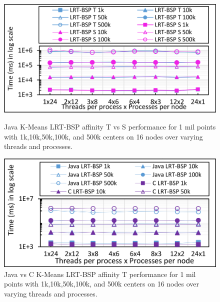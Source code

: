 \documentclass[10pt, conference, compsocconf]{IEEEtran}
\begin{document}
\begin{figure}[!htb]
    \begin{minipage}{0.49\textwidth}
        \centering
        \includegraphics[width=1\columnwidth]{images/fig_kmeans_1mil_varying_centers_BSP_T_vs_BSP_S_Java}
		\caption{Java K-Means \ac{LRT-BSP} affinity T vs S performance for 1 mil points with 1k,10k,50k,100k, and 500k centers on 16 nodes over varying threads and processes.}
		\label{fig:images/fig_kmeans_1mil_varying_centers_BSP_T_C_vs_Java}
    \end{minipage}
    \hspace{1.4mm}
    \begin{minipage}{0.49\textwidth}
        \centering
        \includegraphics[width=1\columnwidth]{images/fig_kmeans_1mil_varying_centers_BSP_T_C_vs_Java}
		\caption{Java vs C K-Means \ac{LRT-BSP} affinity T performance for 1 mil points with 1k,10k,50k,100k, and 500k centers on 16 nodes over varying threads and processes.}
		\label{fig:images/fig_kmeans_1mil_varying_centers_BSP_T_C_vs_Java}
    \end{minipage}   
\end{figure}
\end{document}
